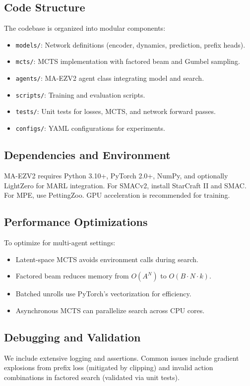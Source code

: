 \documentclass{article}
\begin{document}
\subsection{Code Structure}
The codebase is organized into modular components:
\begin{itemize}
  \item \texttt{models/}: Network definitions (encoder, dynamics, prediction, prefix heads).
  \item \texttt{mcts/}: MCTS implementation with factored beam and Gumbel sampling.
  \item \texttt{agents/}: MA-EZV2 agent class integrating model and search.
  \item \texttt{scripts/}: Training and evaluation scripts.
  \item \texttt{tests/}: Unit tests for losses, MCTS, and network forward passes.
  \item \texttt{configs/}: YAML configurations for experiments.
\end{itemize}

\subsection{Dependencies and Environment}
MA-EZV2 requires Python 3.10+, PyTorch 2.0+, NumPy, and optionally LightZero for MARL integration. For SMACv2, install StarCraft II and SMAC. For MPE, use PettingZoo. GPU acceleration is recommended for training.

\subsection{Performance Optimizations}
To optimize for multi-agent settings:
\begin{itemize}
  \item Latent-space MCTS avoids environment calls during search.
  \item Factored beam reduces memory from $O(A^N)$ to $O(B \cdot N \cdot k)$.
  \item Batched unrolls use PyTorch's vectorization for efficiency.
  \item Asynchronous MCTS can parallelize search across CPU cores.
\end{itemize}

\subsection{Debugging and Validation}
We include extensive logging and assertions. Common issues include gradient explosions from prefix loss (mitigated by clipping) and invalid action combinations in factored search (validated via unit tests).
\end{document}
